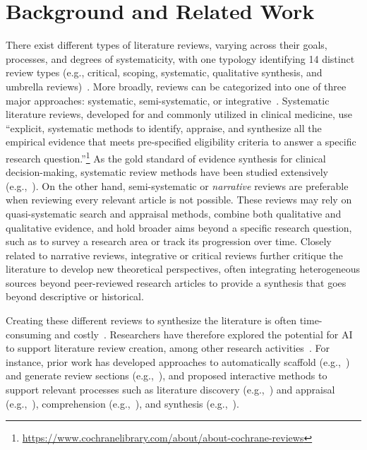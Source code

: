\section{Background and Related Work}
There exist different types of literature reviews, varying across their goals, processes, and degrees of systematicity, with one typology identifying 14 distinct review types (e.g., critical, scoping, systematic, qualitative synthesis, and umbrella reviews)~\cite{grant2009typology}. More broadly, reviews can be categorized into one of three major approaches: systematic, semi-systematic, or integrative~\cite{snyder2019literature}. Systematic literature reviews, developed for and commonly utilized in clinical medicine, use ``explicit, systematic methods to identify, appraise, and synthesize all the empirical evidence that meets pre-specified eligibility criteria to answer a specific research question.''\footnote{\url{https://www.cochranelibrary.com/about/about-cochrane-reviews}} As the gold standard of evidence synthesis for clinical decision-making, systematic review methods have been studied extensively (e.g.,~\cite{chandler2013cochrane, pati2018write, lasserson2019starting}). On the other hand, semi-systematic or \textit{narrative} reviews are preferable when reviewing every relevant article is not possible. These reviews may rely on quasi-systematic search and appraisal methods, combine both qualitative and qualitative evidence, and hold broader aims beyond a specific research question, such as to survey a research area or track its progression over time. Closely related to narrative reviews, integrative or critical reviews further critique the literature to develop new theoretical perspectives, often integrating heterogeneous sources beyond peer-reviewed research articles to provide a synthesis that goes beyond descriptive or historical.

Creating these different reviews to synthesize the literature is often time-consuming and costly~\cite{tricco2008following, michelson2019significant}. Researchers have therefore explored the potential for AI to support literature review creation, among other research activities~\cite{van2023ai, morris_scientists_2023, messeri2024artificial}. For instance, prior work has developed approaches to automatically scaffold (e.g.,~\cite{hsu-etal-2024-chime, newman-etal-2024-arxivdigestables}) and generate review sections (e.g.,~\cite{li-ouyang-2024-related, bolanos2024artificial, wang2024autosurvey}), and proposed interactive methods to support relevant processes such as literature discovery (e.g.,~\cite{Kinney2023TheSS, xiao2023AutoSurveyGPT}) and appraisal (e.g.,~\cite{kusa2023cruise, chai2021research}), comprehension (e.g.,~\cite{lo2023semanticreaderprojectaugmenting, head2021scholarphi}), and synthesis (e.g.,~\cite{kang_synergi_2023, kang_threddy_2022, wang2024scidasynth}).

